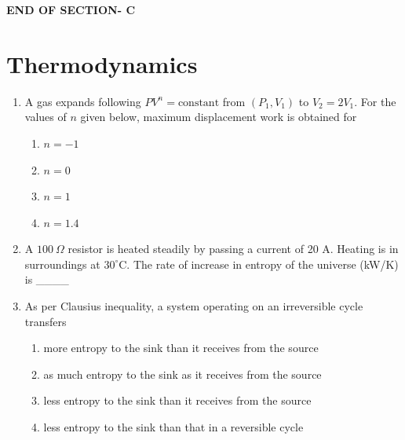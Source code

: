 \documentclass[journal,12pt,onecolumn]{IEEEtran}
\begin{document}
\vspace{3\baselineskip}
\begin{center}
    \item[\textbf{END OF SECTION- C}]
\end{center}


\newpage
\section*{Thermodynamics}
\vspace{1cm}

\begin{enumerate}[label=\arabic*)]

\item A gas expands following $PV^n = \text{constant}$ from $(P_1,V_1)$ to $V_2 = 2V_1$. For the values of $n$ given below, maximum displacement work is obtained for  
\hfill{} \\

\vspace{0.2cm}
\begin{enumerate}[label=\alph*)]
\item $n = -1$
\item $n = 0$
\item $n = 1$
\item $n = 1.4$
\end{enumerate}
\vspace{0.5cm}

\item A $100\ \Omega$ resistor is heated steadily by passing a current of 20 A. Heating is in surroundings at $30^\circ$C. The rate of increase in entropy of the universe (kW/K) is \_\_\_\_
\hfill{} \\

\vspace{0.5cm}

\item As per Clausius inequality, a system operating on an irreversible cycle transfers  
\hfill{} \\

\vspace{0.2cm}
\begin{enumerate}[label=\alph*)]
\item more entropy to the sink than it receives from the source
\item as much entropy to the sink as it receives from the source
\item less entropy to the sink than it receives from the source
\item less entropy to the sink than that in a reversible cycle
\end{enumerate}
\vspace{0.5cm}


\end{enumerate}
\end{document}
